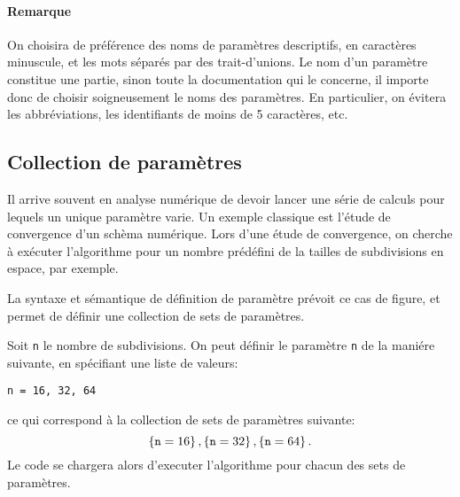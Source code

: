 \paragraph{Remarque} On choisira de pr\'ef\'erence des noms de
param\`etres descriptifs, en caract\`eres minuscule, et les mots
s\'epar\'es par des trait-d'unions. Le nom d'un param\`etre constitue
une partie, sinon toute la documentation qui le concerne, il importe
donc de choisir soigneusement le noms des param\`etres. En
particulier, on \'evitera les abbr\'eviations, les identifiants de
moins de 5 caract\`eres, etc.

\subsection{Collection de param\`etres}
Il arrive souvent en analyse num\'erique de devoir lancer une s\'erie
de calculs pour lequels un unique param\`etre varie. Un exemple
classique est l'\'etude de convergence d'un sch\`ema num\'erique. Lors
d'une \'etude de convergence, on cherche \`a ex\'ecuter l'algorithme
pour un nombre pr\'ed\'efini de la tailles de subdivisions en espace,
par exemple.

La syntaxe et s\'emantique de d\'efinition de param\`etre pr\'evoit ce
cas de figure, et permet de d\'efinir une collection de sets de
param\`etres.

Soit \texttt{n} le nombre de subdivisions. On peut d\'efinir le
param\`etre \texttt{n} de la mani\'ere suivante, en sp\'ecifiant une
liste de valeurs:
\begin{lstlisting}[language={},frame=single,basicstyle=\ttfamily]
  n = 16, 32, 64
\end{lstlisting}
ce qui correspond \`a la collection de sets de param\`etres suivante:
\begin{equation}
  \left\{ \mathtt{n} = 16 \right\}, \left\{ \mathtt{n} = 32 \right\}, \left\{ \mathtt{n} = 64 \right\}.
\end{equation}
Le code se chargera alors d'executer l'algorithme pour chacun des sets
de param\`etres.

